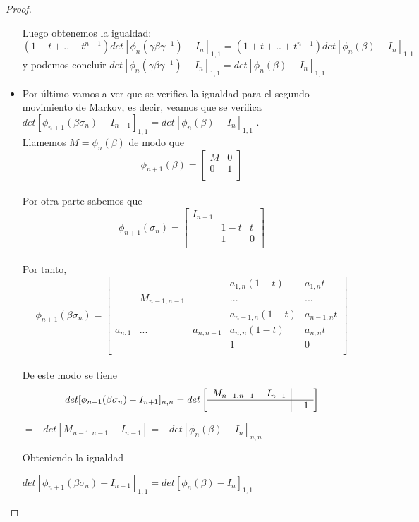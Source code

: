 \begin{proof}
\begin{itemize}
	 Luego obtenemos la igualdad:\\
	  $ (1+t+..+ t^{n-1} ) det[ \phi_{n}(\gamma\beta\gamma^{-1}) - I_{n}] _{1,1} = (1+t+..+ t^{n-1} ) det[ \phi_{n}(\beta) - I_{n}] _{1,1} $\\
	  
	  y podemos concluir
	  $ det[ \phi_{n}(\gamma\beta\gamma^{-1}) - I_{n}] _{1,1} = det[ \phi_{n}(\beta) - I_{n}] _{1,1} $\\
	  
	  \item 
	  Por último vamos a ver que se verifica la igualdad para el segundo movimiento de Markov, es decir, veamos que se verifica $ det[\phi_{n+1}(\beta\sigma_{n}) - I_{n+1}]_{1,1} = det[\phi_{n}(\beta) - I_{n}]_{1,1}$ .\\
	  
	  Llamemos $ M = \phi_{n}(\beta) $ de modo que 
 	 \[ \phi_{n+1}(\beta) = \left[\begin{array}{r|r}
 	  M & 0 \\ \hline	
 	  0 & 1\\
 	 \end{array}\right]\]\\	  
 	 
 	 Por otra parte sabemos que 
 	 \[ \phi_{n+1} (\sigma_{n}) = \begin{bmatrix}
 	 I_{n-1} &  &  \\
 	 & 1-t & t  \\
 	 & 1 & 0  \\
 	 \end{bmatrix}\]\\
 	 
 	 Por tanto, 
 	 \[ \phi_{n+1} (\beta\sigma_{n}) = \begin{bmatrix}
 	 & & & a_{1,n}(1-t) & a_{1,n}t\\
 	 & M_{n-1,n-1} & & ... & ...\\
 	 & & & a_{n-1,n}(1-t) & a_{n-1,n}t\\
 	 a_{n,1}& ... & a_{n,n-1} & a_{n,n}(1-t) & a_{n,n}t\\
 	 & & & 1 & 0\\
 	 \end{bmatrix}\]\\
	  
	 De este modo se tiene 
 	 \[det[\phi_{n+1}(\beta\sigma_{n}) - I_{n+1}]_{n,n} = det \left[\begin{array}{r|r}
    	M_{n-1,n-1} - I_{n-1} & \\ \hline	
 	    & -1\\
 	 \end{array}\right]\] 
 	 \begin{center}
 	 	$ = -det[M_{n-1,n-1}-I_{n-1}] = -det[\phi_{n}(\beta)-I_{n}]_{n,n} $ 
 	 \end{center} 
 	 
 	 Obteniendo la igualdad
 	  	 \begin{center}
 	  	 	$ det[\phi_{n+1}(\beta\sigma_{n}) - I_{n+1}]_{1,1} = det[\phi_{n}(\beta)-I_{n}]_{1,1} $ 
 	  	 \end{center}
      \end{itemize}
 \end{proof}


